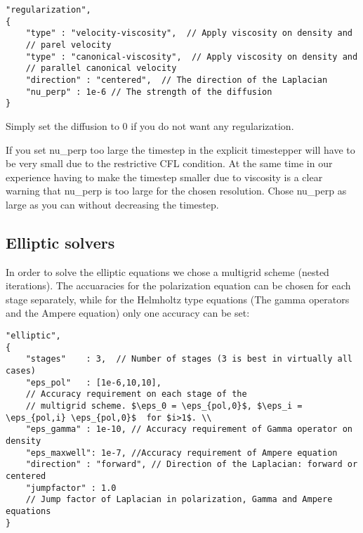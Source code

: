 \begin{verbatim}
"regularization",
{
    "type" : "velocity-viscosity",  // Apply viscosity on density and
    // parel velocity
    "type" : "canonical-viscosity",  // Apply viscosity on density and
    // parallel canonical velocity
    "direction" : "centered",  // The direction of the Laplacian
    "nu_perp" : 1e-6 // The strength of the diffusion
}
\end{verbatim}
Simply set the diffusion to 0 if you do not want any regularization.
\begin{tcolorbox}[title=Note]
    If you set nu\_perp too large the timestep in the explicit timestepper will
    have to be very small due to the restrictive CFL condition. At the same
    time in our experience having to make the timestep smaller due to viscosity
    is a clear warning that nu\_perp is too large for the chosen resolution.
    Chose nu\_perp as large as you can without decreasing the timestep.
\end{tcolorbox}

\subsection{Elliptic solvers}
In order to solve the elliptic equations we chose a multigrid scheme (nested
iterations). The accuaracies for the polarization equation can be chosen for
each stage separately, while for the Helmholtz type equations (The gamma
operators and the Ampere equation) only one accuracy can be set:
\begin{verbatim}
"elliptic",
{
    "stages"    : 3,  // Number of stages (3 is best in virtually all cases)
    "eps_pol"   : [1e-6,10,10],
    // Accuracy requirement on each stage of the
    // multigrid scheme. $\eps_0 = \eps_{pol,0}$, $\eps_i = \eps_{pol,i} \eps_{pol,0}$  for $i>1$. \\
    "eps_gamma" : 1e-10, // Accuracy requirement of Gamma operator on density
    "eps_maxwell": 1e-7, //Accuracy requirement of Ampere equation
    "direction" : "forward", // Direction of the Laplacian: forward or centered
    "jumpfactor" : 1.0
    // Jump factor of Laplacian in polarization, Gamma and Ampere equations
}
\end{verbatim}

